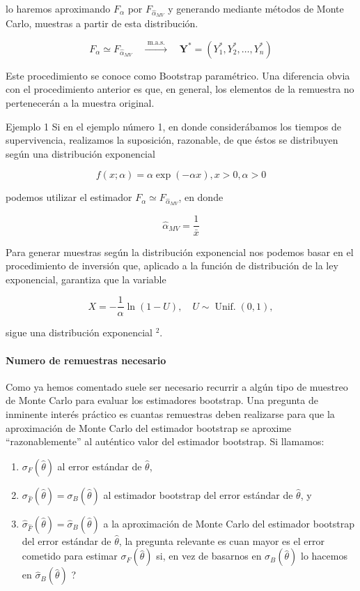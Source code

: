 \documentclass[
]{article}
\providecommand{\tightlist}{%
  \setlength{\itemsep}{0pt}\setlength{\parskip}{0pt}}
\begin{document}
lo haremos aproximando \(F_{\alpha}\) por \(F_{\hat{\alpha}_{M V}}\) y generando mediante métodos de Monte Carlo, muestras a partir de esta distribución.

\[
F_{\alpha} \simeq F_{\hat{\alpha}_{M V}} \quad \xrightarrow{\text { m.a.s. }} \quad \mathbf{Y}^{*}=\left(Y_{1}^{*}, Y_{2}^{*}, \ldots, Y_{n}^{*}\right)
\]

Este procedimiento se conoce como Bootstrap paramétrico. Una diferencia obvia con el procedimiento anterior es que, en general, los elementos de la remuestra no pertenecerán a la muestra original.

Ejemplo 1 Si en el ejemplo número 1, en donde considerábamos los tiempos de supervivencia, realizamos la suposición, razonable, de que éstos se distribuyen según una distribución exponencial

\[
f(x ; \alpha)=\alpha \exp (-\alpha x), x>0, \alpha>0
\]

podemos utilizar el estimador \(F_{\alpha} \simeq F_{\hat{\alpha}_{M V}}\), en donde

\[
\hat{\alpha}_{M V}=\frac{1}{\bar{x}}
\]

Para generar muestras según la distribución exponencial nos podemos basar en el procedimiento de inversión que, aplicado a la función de distribución de la ley exponencial, garantiza que la variable

\[
X=-\frac{1}{\alpha} \ln (1-U), \quad U \sim \operatorname{Unif.}(0,1),
\]

sigue una distribución exponencial \({ }^{2}\).

\paragraph{Numero de remuestras necesario}\label{numero-de-remuestras-necesario}

Como ya hemos comentado suele ser necesario recurrir a algún tipo de muestreo de Monte Carlo para evaluar los estimadores bootstrap. Una pregunta de inminente interés práctico es cuantas remuestras deben realizarse para que la aproximación de Monte Carlo del estimador bootstrap se aproxime ``razonablemente'' al auténtico valor del estimador bootstrap. Si llamamos:

\begin{enumerate}
\def\labelenumi{\arabic{enumi}.}
\tightlist
\item
  \(\sigma_{F}(\hat{\theta})\) al error estándar de \(\hat{\theta}\),
\item
  \(\sigma_{\hat{F}}(\hat{\theta})=\sigma_{B}(\hat{\theta})\) al estimador bootstrap del error estándar de \(\hat{\theta}\), y
\item
  \(\hat{\sigma}_{\hat{F}}(\hat{\theta})=\hat{\sigma}_{B}(\hat{\theta})\) a la aproximación de Monte Carlo del estimador bootstrap del error estándar de \(\hat{\theta}\),
  la pregunta relevante es cuan mayor es el error cometido para estimar \(\sigma_{F}(\hat{\theta})\) si, en vez de basarnos en \(\sigma_{B}(\hat{\theta})\) lo hacemos en \(\hat{\sigma}_{B}(\hat{\theta})\) ?
\end{enumerate}
\end{document}
